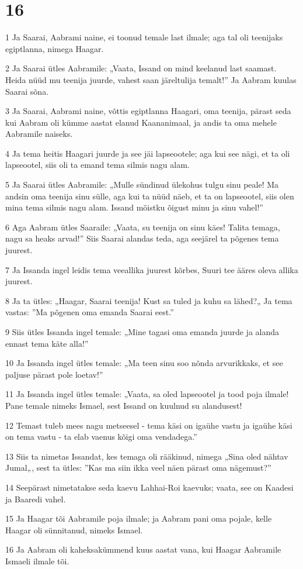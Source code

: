 \chapter{16}

\par 1 Ja Saarai, Aabrami naine, ei toonud temale last ilmale; aga tal oli teenijaks egiptlanna, nimega Haagar.
\par 2 Ja Saarai ütles Aabramile: „Vaata, Issand on mind keelanud last saamast. Heida nüüd mu teenija juurde, vahest saan järeltulija temalt!” Ja Aabram kuulas Saarai sõna.
\par 3 Ja Saarai, Aabrami naine, võttis egiptlanna Haagari, oma teenija, pärast seda kui Aabram oli kümme aastat elanud Kaananimaal, ja andis ta oma mehele Aabramile naiseks.
\par 4 Ja tema heitis Haagari juurde ja see jäi lapseootele; aga kui see nägi, et ta oli lapseootel, siis oli ta emand tema silmis nagu alam.
\par 5 Ja Saarai ütles Aabramile: „Mulle sündinud ülekohus tulgu sinu peale! Ma andsin oma teenija sinu sülle, aga kui ta nüüd näeb, et ta on lapseootel, siis olen mina tema silmis nagu alam. Issand mõistku õigust minu ja sinu vahel!”
\par 6 Aga Aabram ütles Saaraile: „Vaata, su teenija on sinu käes! Talita temaga, nagu sa heaks arvad!” Siis Saarai alandas teda, aga seejärel ta põgenes tema juurest.
\par 7 Ja Issanda ingel leidis tema veeallika juurest kõrbes, Suuri tee ääres oleva allika juurest.
\par 8 Ja ta ütles: „Haagar, Saarai teenija! Kust sa tuled ja kuhu sa lähed?„ Ja tema vastas: ”Ma põgenen oma emanda Saarai eest.”
\par 9 Siis ütles Issanda ingel temale: „Mine tagasi oma emanda juurde ja alanda ennast tema käte alla!”
\par 10 Ja Issanda ingel ütles temale: „Ma teen sinu soo nõnda arvurikkaks, et see paljuse pärast pole loetav!”
\par 11 Ja Issanda ingel ütles temale: „Vaata, sa oled lapseootel ja tood poja ilmale! Pane temale nimeks Ismael, sest Issand on kuulnud su alandusest!
\par 12 Temast tuleb mees nagu metseesel - tema käsi on igaühe vastu ja igaühe käsi on tema vastu - ta elab vaenus kõigi oma vendadega.”
\par 13 Siis ta nimetas Issandat, kes temaga oli rääkinud, nimega „Sina oled nähtav Jumal„, sest ta ütles: ”Kas ma siin ikka veel näen pärast oma nägemust?”
\par 14 Seepärast nimetatakse seda kaevu Lahhai-Roi kaevuks; vaata, see on Kaadesi ja Baaredi vahel.
\par 15 Ja Haagar tõi Aabramile poja ilmale; ja Aabram pani oma pojale, kelle Haagar oli sünnitanud, nimeks Ismael.
\par 16 Ja Aabram oli kaheksakümmend kuus aastat vana, kui Haagar Aabramile Ismaeli ilmale tõi.

